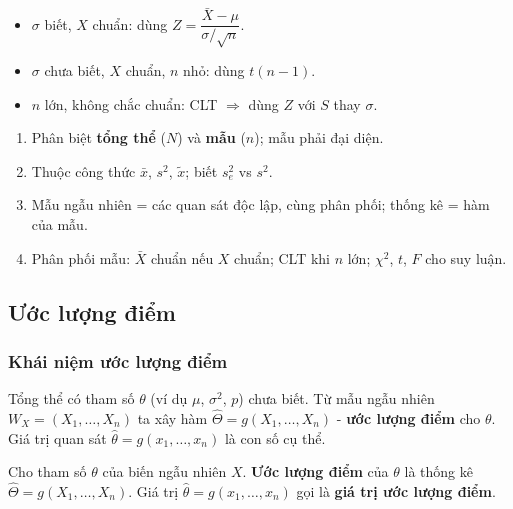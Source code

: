 \documentclass[12pt,a4paper]{article}
\begin{document}
\begin{luuy}[title={Khi nào dùng phân phối nào?}]
\begin{itemize}
  \item $\sigma$ biết, $X$ chuẩn: dùng $Z = \dfrac{\bar{X}-\mu}{\sigma/\sqrt{n}}$.
  \item $\sigma$ chưa biết, $X$ chuẩn, $n$ nhỏ: dùng $t(n-1)$.
  \item $n$ lớn, không chắc chuẩn: CLT $\Rightarrow$ dùng $Z$ với $S$ thay $\sigma$.
\end{itemize}
\end{luuy}

\begin{tongket}[title={Tổng kết mục Mẫu ngẫu nhiên và phân phối mẫu}]
\begin{enumerate}
  \item Phân biệt \textbf{tổng thể} ($N$) và \textbf{mẫu} ($n$); mẫu phải đại diện.
  \item Thuộc công thức $\bar{x}$, $s^2$, $\tilde{x}$; biết $s_e^2$ vs $s^2$.
  \item Mẫu ngẫu nhiên = các quan sát độc lập, cùng phân phối; thống kê = hàm của mẫu.
  \item Phân phối mẫu: $\bar{X}$ chuẩn nếu $X$ chuẩn; CLT khi $n$ lớn; $\chi^2$, $t$, $F$ cho suy luận.
\end{enumerate}
\end{tongket}
\subsection{Ước lượng điểm}

\subsubsection{Khái niệm ước lượng điểm}

\begin{dongco}[title={Động cơ - Từ mẫu suy ra tham số}]
Tổng thể có tham số $\theta$ (ví dụ $\mu$, $\sigma^2$, $p$) chưa biết. Từ mẫu ngẫu nhiên $W_X = (X_1,\ldots,X_n)$ ta xây hàm $\hat{\Theta} = g(X_1,\ldots,X_n)$ - \textbf{ước lượng điểm} cho $\theta$. Giá trị quan sát $\hat{\theta} = g(x_1,\ldots,x_n)$ là con số cụ thể.
\end{dongco}

\begin{dinhnghia}[title={Ước lượng điểm}]
  Cho tham số $\theta$ của biến ngẫu nhiên $X$. \textbf{Ước lượng điểm} của $\theta$ là thống kê $\hat{\Theta} = g(X_1,\ldots,X_n)$.
  Giá trị $\hat{\theta} = g(x_1,\ldots,x_n)$ gọi là \textbf{giá trị ước lượng điểm}.
\end{dinhnghia}
\end{document}
